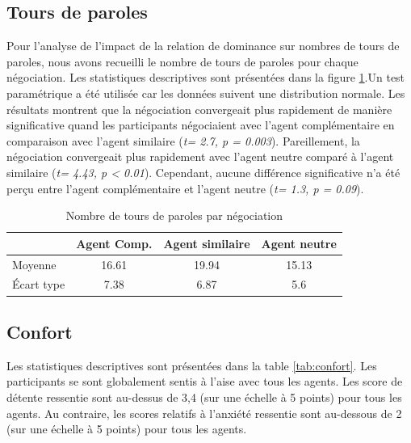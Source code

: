 	\subsection{Tours de paroles}
			
			Pour l'analyse de l'impact de la relation de dominance sur nombres de tours de paroles, nous avons recueilli le nombre de tours de paroles pour chaque négociation. Les statistiques descriptives sont présentées dans la figure \ref{tab:tour}.Un test paramétrique a été utilisée car les données suivent une distribution normale. Les résultats montrent que la négociation convergeait plus rapidement de manière significative quand les participants négociaient avec l'agent complémentaire en comparaison avec l'agent similaire (\emph{t= 2.7, p = 0.003}). Pareillement, la négociation convergeait plus rapidement avec l'agent neutre comparé à l'agent similaire (\emph{t= 4.43, p < 0.01}).  
			Cependant, aucune différence significative n'a été perçu entre l'agent complémentaire et l'agent neutre (\emph{t= 1.3, p = 0.09}).  
		
			\begin{table}[b]
				\caption{Nombre de tours de paroles par négociation} 
				\centering
				
				\begin{tabular}{ l c c c  }
					\hline
					\textbf{ }& \textbf{Agent Comp.} & \textbf{Agent similaire} & \textbf{Agent neutre} \\ 
					\hline
					\newline Moyenne & 16.61& 19.94 & 15.13 \\
					\newline Écart type & 7.38 & 6.87 & 5.6 \\
					\hline
					
				\end{tabular}
				
				\label{tab:tour}
			\end{table}
	
	\subsection{Confort}
		
		Les statistiques descriptives sont présentées dans la table \ref{tab:confort}. Les participants se sont globalement sentis à l'aise avec tous les agents.
		Les score de détente ressentie sont au-dessus de 3,4 (sur une échelle à 5 points) pour tous les agents. Au contraire, les scores relatifs à l'anxiété  ressentie sont au-dessous de 2 (sur une échelle à 5 points) pour tous les agents. 
		

